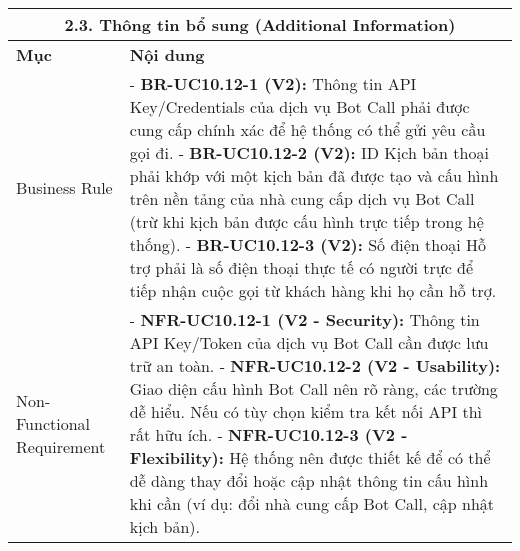 \begin{longtable}{|m{4cm}|p{11cm}|}
\hline
\multicolumn{2}{|c|}{\textbf{2.3. Thông tin bổ sung (Additional Information)}} \\
\hline
\textbf{Mục} & \textbf{Nội dung} \\
\hline
Business Rule & - \textbf{BR-UC10.12-1 (V2):} Thông tin API Key/Credentials của dịch vụ Bot Call phải được cung cấp chính xác để hệ thống có thể gửi yêu cầu gọi đi. \newline - \textbf{BR-UC10.12-2 (V2):} ID Kịch bản thoại phải khớp với một kịch bản đã được tạo và cấu hình trên nền tảng của nhà cung cấp dịch vụ Bot Call (trừ khi kịch bản được cấu hình trực tiếp trong hệ thống). \newline - \textbf{BR-UC10.12-3 (V2):} Số điện thoại Hỗ trợ phải là số điện thoại thực tế có người trực để tiếp nhận cuộc gọi từ khách hàng khi họ cần hỗ trợ. \\
\hline
Non-Functional Requirement & - \textbf{NFR-UC10.12-1 (V2 - Security):} Thông tin API Key/Token của dịch vụ Bot Call cần được lưu trữ an toàn. \newline - \textbf{NFR-UC10.12-2 (V2 - Usability):} Giao diện cấu hình Bot Call nên rõ ràng, các trường dễ hiểu. Nếu có tùy chọn kiểm tra kết nối API thì rất hữu ích. \newline - \textbf{NFR-UC10.12-3 (V2 - Flexibility):} Hệ thống nên được thiết kế để có thể dễ dàng thay đổi hoặc cập nhật thông tin cấu hình khi cần (ví dụ: đổi nhà cung cấp Bot Call, cập nhật kịch bản). \\
\hline
\end{longtable}

